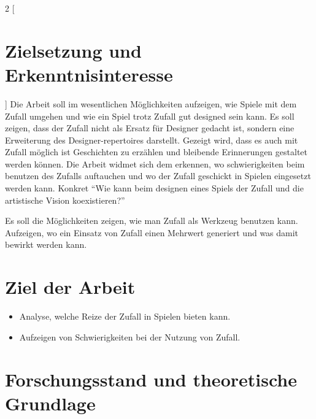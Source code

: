\documentclass[10pt,a4paper]{article}
\begin{document}
\begin{multicols}{2}
[
\section{Zielsetzung und Erkenntnisinteresse}
]
Die Arbeit soll im wesentlichen Möglichkeiten aufzeigen, wie Spiele mit dem Zufall umgehen und wie ein Spiel trotz Zufall gut designed sein kann. Es soll zeigen, dass der Zufall nicht als Ersatz für Designer gedacht ist, sondern eine Erweiterung des Designer-repertoires darstellt. Gezeigt wird, dass es auch mit Zufall möglich ist Geschichten zu erzählen und bleibende Erinnerungen gestaltet werden können. Die Arbeit widmet sich dem erkennen, wo schwierigkeiten beim benutzen des Zufalls auftauchen und wo der Zufall geschickt in Spielen eingesetzt werden kann. Konkret “Wie kann beim designen eines Spiels der Zufall und die artistische Vision koexistieren?”

Es soll die Möglichkeiten zeigen, wie man Zufall als Werkzeug benutzen kann. Aufzeigen, wo ein Einsatz von Zufall einen Mehrwert generiert und was damit bewirkt werden kann.
\end{multicols}

\section{Ziel der Arbeit}
\begin{itemize}
\item Analyse, welche Reize der Zufall in Spielen bieten kann.
\item Aufzeigen von Schwierigkeiten bei der Nutzung von Zufall.
\end{itemize}

\section{Forschungsstand und theoretische Grundlage}
\end{document}
